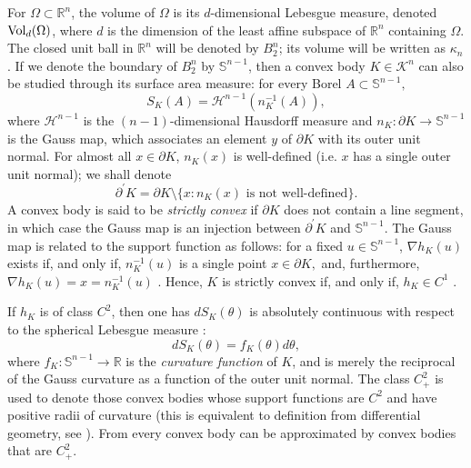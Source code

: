 \documentclass[11pt]{amsart}
\theoremstyle{definition}
\theoremstyle{remark}
\numberwithin{equation}{section}
\newcommand{\R}{\mathbb{R}}
\newcommand{\s}{\mathbb{S}}
\newcommand{\conbod}{\mathcal{K}^n}
\newcommand{\vol}{\text{\rm Vol}}
\begin{document}
For $\Omega\subset\R^n$, the volume of $\Omega$ is its $d$-dimensional Lebesgue measure, denoted $\vol_d(\Omega)$, where $d$ is the dimension of the least affine subspace of $\R^n$ containing $\Omega$. The closed unit ball in $\R^n$ will be denoted by $B_2^n$; its volume will be written  as $\kappa_n$. If we denote the boundary of $B_2^n$ by $\s^{n-1}$, then a convex body $K\in\conbod$ can also be studied through its surface area measure: for every Borel $A \subset \s^{n-1},$ $$S_K(A)=\mathcal{H}^{n-1}(n^{-1}_K(A)),$$ where $\mathcal{H}^{n-1}$ is the $(n-1)$-dimensional Hausdorff measure and $n_K:\partial K \rightarrow \s^{n-1}$ is the Gauss map, which associates an element $y$ of $\partial K$ with its outer unit normal. For almost all $x\in\partial K$, $n_K(x)$ is well-defined (i.e. $x$ has a single outer unit normal); we shall denote $$\partial^\prime K = \partial K\setminus \{x: n_K(x) \text{ is not well-defined}\}.$$ A convex body is said to be \textit{strictly convex} if $\partial K$ does not contain a line segment, in which case the Gauss map is an injection between $\partial^\prime K$ and $\s^{n-1}$. The Gauss map is related to the support function as follows: for a fixed $u\in\s^{n-1}$, $\nabla h_K(u)$ exists if, and only if, $n_K^{-1}(u)$ is a single point $x\in\partial K,$ and, furthermore, $\nabla h_K(u)=x=n^{-1}_K(u)$ \cite[Corollary 1.7.3]{Sh1}. Hence, $K$ is strictly convex if, and only if, $h_K\in C^1$ \cite[Page 115]{Sh1}.

If $h_K$ is of class $C^2$, then one has $dS_K(\theta)$ is absolutely continuous with respect to the spherical Lebesgue measure \cite[Corollary 2.5.3]{Sh1}: $$dS_K(\theta) = f_K(\theta) d\theta,$$
	where $f_K \colon \s^{n-1} \to \R$ is the \textit{curvature function} of $K$, and is merely the reciprocal of the Gauss curvature as a function of the outer unit normal. The class $C^2_+$ is used to denote those convex bodies whose support functions are $C^2$ and have positive radii of curvature (this is equivalent to definition from differential geometry, see \cite[Page 120]{Sh1}). From \cite[Theorem 2.7.1]{Sh1} every convex body can be approximated by convex bodies that are $C^2_+.$
\end{document}
